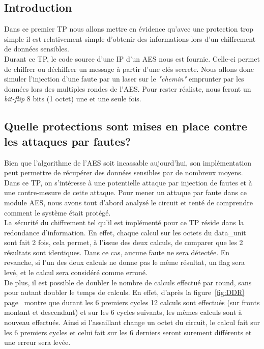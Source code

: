 \subsection{Introduction}
Dans ce premier TP nous allons mettre en évidence qu'avec une protection trop simple 
il est relativement simple d'obtenir des informations lors d'un chiffrement de données 
sensibles.\\

Durant ce TP, le code source d'une IP d'un AES nous est fournie. 
Celle-ci permet de chiffrer ou déchiffrer un message à partir d'une clés secrete. 
Nous allons donc simuler l'injection d'une faute par un laser sur le {\em "chemin"} 
emprunter par les données lors des multiples rondes de l'AES.
Pour rester réaliste, nous feront un {\em bit-flip} 8 bits (1 octet) une et une seule fois.

\subsection{Quelle protections sont mises en place contre les attaques par fautes?}

Bien que l'algorithme de l'AES soit incassable aujourd'hui, son implémentation
peut permettre de récupérer des données sensibles par de nombreux moyens.
Dans ce TP, on s'intéresse à une potentielle attaque par injection de fautes et
à une contre-mesure de cette attaque.
Pour mener un attaque par faute  dans ce module AES, nous avons tout d'abord
analysé le circuit et tenté de comprendre comment le système était protégé.\\

La sécurité du chiffrement tel qu'il est implémenté pour ce TP réside dans la
redondance d'information.
En effet, chaque calcul sur les octets du data\_unit sont fait 2 fois, cela
permet, à l'issue des deux calculs, de comparer que les 2 résultats sont
identiques.
Dans ce cas, aucune faute ne sera détectée. En revanche, si l'un des deux
calculs ne donne pas le même résultat, un flag sera levé, et le calcul sera
considéré comme erroné.\\

De plus, il est possible de doubler le nombre de calculs effectué par round,
sans pour autant doubler le temps de calculs.
En effet, d'après la figure~\ref{fig:DDR} page~\pageref{fig:DDR} montre que
durant les 6 premiers cycles 12 calculs sont effectués (sur fronts montant et
descendant) et sur les 6 cycles suivants, 
les mêmes calculs sont à nouveau effectués.
Ainsi si l'assaillant change un octet du circuit, le calcul fait sur les 6
premiers cycles et celui fait sur les 6 derniers seront surement différents et
une erreur sera levée.

